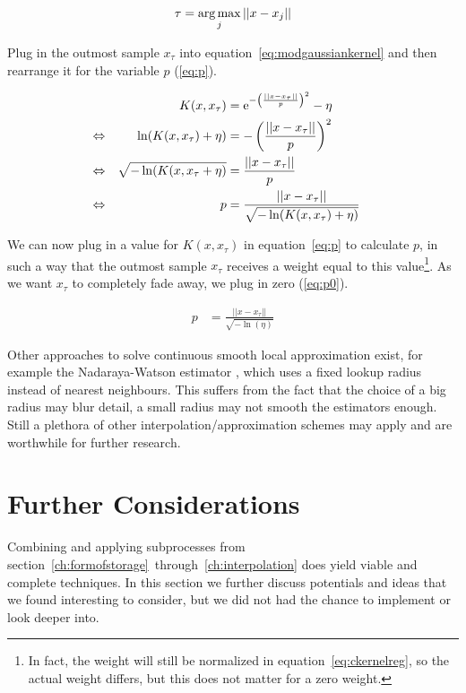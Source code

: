 \begin{align}
\label{eq:tau}
\tau = \operatorname*{arg\,max}_j ||x - x_j||
\end{align}

Plug in the outmost sample $x_\tau$ into equation~\ref{eq:modgaussiankernel} and then rearrange it for the variable $p$ (\ref{eq:p}). 

\begin{align}
&&K(x, x_\tau)&=\mathrm{e}^{-\left(\frac{||x-x_\tau||}{p}\right)^2} - \eta \label{eq:modgaussiankernel} &&\\
\Leftrightarrow&&\ln(K(x, x_\tau) + \eta) &= -\left(\frac{||x-x_\tau||}{p}\right)^2 \notag &&\\
\Leftrightarrow&& \sqrt{-\ln(K(x, x_\tau + \eta)} &= \frac{||x-x_\tau||}{p} \notag &&\\
\Leftrightarrow&& p &= \frac{||x-x_\tau||}{\sqrt{-\ln(K(x, x_\tau) + \eta)}} \label{eq:p}&&
\end{align}

We can now plug in a value for $K(x, x_\tau)$ in equation~\ref{eq:p} to calculate $p$, in such a way that the outmost sample $x_\tau$ receives a weight equal to this value\footnote{In fact, the weight will still be normalized in equation~\ref{eq:ckernelreg}, so the actual weight differs, but this does not matter for a zero weight.}. As we want $x_\tau$ to completely fade away, we plug in zero (\ref{eq:p0}).

\begin{align}
p &= \frac{||x-x_\tau||}{\sqrt{-\ln(\eta)}} \label{eq:p0}
\end{align}

Other approaches to solve continuous smooth local approximation exist, for example the Nadaraya-Watson estimator \cite{nadaraya1964estimating}, which uses a fixed lookup radius instead of nearest neighbours. This suffers from the fact that the choice of a big radius may blur detail, a small radius may not smooth the estimators enough. Still a plethora of other interpolation/approximation schemes may apply and are worthwhile for further research.


\section{Further Considerations}

Combining and applying subprocesses from section~\ref{ch:formofstorage}~through~\ref{ch:interpolation} does yield viable and complete techniques. In this section we further discuss potentials and ideas that we found interesting to consider, but we did not had the chance to implement or look deeper into.

